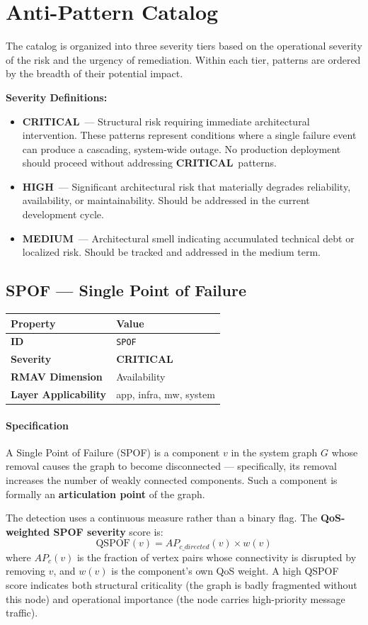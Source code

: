 \documentclass[11pt]{article}
\makeatletter
\newcommand{\CRITICAL}{\textcolor{red!70!black}{\textbf{CRITICAL}}}
\newcommand{\HIGH}{\textcolor{orange!80!black}{\textbf{HIGH}}}
\newcommand{\MEDIUM}{\textcolor{yellow!50!black}{\textbf{MEDIUM}}}
\newcommand{\patternprop}[4]{%
  \begin{center}
  \begin{tabular}{@{}ll@{}}
  \toprule
  \textbf{Property} & \textbf{Value} \\
  \midrule
  \textbf{ID} & \texttt{#1} \\
  \textbf{Severity} & #2 \\
  \textbf{RMAV Dimension} & #3 \\
  \textbf{Layer Applicability} & #4 \\
  \bottomrule
  \end{tabular}
  \end{center}
}
\makeatother
\begin{document}
\section{Anti-Pattern Catalog}

The catalog is organized into three severity tiers based on the operational severity of the risk and the urgency of remediation. Within each tier, patterns are ordered by the breadth of their potential impact.

\noindent\textbf{Severity Definitions:}

\begin{itemize}[leftmargin=*]
\item \CRITICAL\ --- Structural risk requiring immediate architectural intervention. These patterns represent conditions where a single failure event can produce a cascading, system-wide outage. No production deployment should proceed without addressing \CRITICAL\ patterns.
\item \HIGH\ --- Significant architectural risk that materially degrades reliability, availability, or maintainability. Should be addressed in the current development cycle.
\item \MEDIUM\ --- Architectural smell indicating accumulated technical debt or localized risk. Should be tracked and addressed in the medium term.
\end{itemize}

\subsection{SPOF --- Single Point of Failure}
\patternprop{SPOF}{\CRITICAL}{Availability}{app, infra, mw, system}

\paragraph{Specification}
A Single Point of Failure (SPOF) is a component $v$ in the system graph $G$ whose removal causes the graph to become disconnected --- specifically, its removal increases the number of weakly connected components. Such a component is formally an \textbf{articulation point} of the graph.

The detection uses a continuous measure rather than a binary flag. The \textbf{QoS-weighted SPOF severity} score is:
\[
\mathrm{QSPOF}(v) = AP_{c\_directed}(v) \times w(v)
\]
where $AP_c(v)$ is the fraction of vertex pairs whose connectivity is disrupted by removing $v$, and $w(v)$ is the component's own QoS weight. A high QSPOF score indicates both structural criticality (the graph is badly fragmented without this node) and operational importance (the node carries high-priority message traffic).
\end{document}
